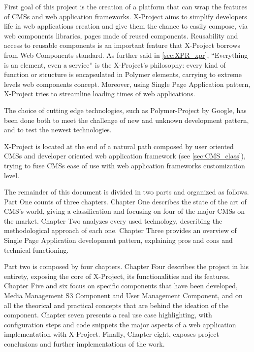First goal of this project is the creation of a platform that can wrap the features of CMSs and web application frameworks. 
X-Project aims to simplify developers life in web applications creation and give them the chance to easily compose, via web components libraries, pages made of reused components.
Reusability and access to reusable components is an important feature that X-Project borrows from Web Components standard.
As further said in \ref{sec:XPR_xpr}, ``Everything is an element, even a service'' is the X-Project's philosophy: every kind of function or structure is encapsulated in Polymer elements, carrying to extreme levels web components concept. 
Moreover, using Single Page Application pattern, X-Project tries to streamline loading times of web applications.

The choice of cutting edge technologies, such as Polymer-Project by Google, has been done both to meet the challenge of new and unknown development pattern, and to test the newest technologies.

X-Project is located at the end of a natural path composed by user oriented CMSs and developer oriented web application framework (see \ref{sec:CMS_class}), trying to fuse CMSs ease of use with web application frameworks customization level.

The remainder of this document is divided in two parts and organized as follows. Part One counts of three chapters. Chapter One describes the state of the art of CMS's world, giving a classification and focusing on four of the major CMSs on the market. Chapter Two analyzes every used technology, describing the methodological approach of each one. Chapter Three provides an overview of Single Page Application development pattern, explaining pros and cons and technical functioning.

Part two is composed by four chapters. Chapter Four describes the project in his entirety, exposing the core of X-Project, its functionalities and its features.
Chapter Five and six focus on specific components that have been developed, Media Management S3 Component and User Management Component, and on all the theorical and practical concepts that are behind the ideation of the component. 
Chapter seven presents a real use case highlighting, with configuration steps and code snippets the major aspects of a web application implementation with X-Project.
Finally, Chapter eight, exposes project conclusions and further implementations of the work.



